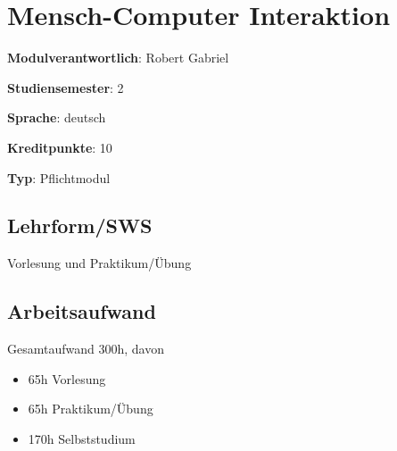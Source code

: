 \hypertarget{mensch-computer-interaktionpathlabelmi-2017modulbeschreibungen-bachelorba_mensch-computer_interaktion}{%
\chapter{Mensch-Computer
Interaktion\label{/mi-2017/modulbeschreibungen-bachelor/BA_Mensch-Computer_Interaktion}}\label{mensch-computer-interaktionpathlabelmi-2017modulbeschreibungen-bachelorba_mensch-computer_interaktion}}

\begin{modulHead}
\textbf{Modulverantwortlich}: Robert
Gabriel
\end{modulHead}
\begin{modulHead}
\textbf{Studiensemester}:
2
\end{modulHead}
\begin{modulHead}
\textbf{Sprache}:
deutsch
\end{modulHead}
\begin{modulHead}
\textbf{Kreditpunkte}:
10
\end{modulHead}
\begin{modulHead}
\textbf{Typ}:
Pflichtmodul
\end{modulHead}


\hypertarget{lehrformswspathlabelmi-2017modulbeschreibungen-bachelorba_mensch-computer_interaktion}{%
\section*{Lehrform/SWS\label{/mi-2017/modulbeschreibungen-bachelor/BA_Mensch-Computer_Interaktion}}\label{lehrformswspathlabelmi-2017modulbeschreibungen-bachelorba_mensch-computer_interaktion}}

Vorlesung und Praktikum/Übung

\hypertarget{arbeitsaufwandpathlabelmi-2017modulbeschreibungen-bachelorba_mensch-computer_interaktion}{%
\section*{Arbeitsaufwand\label{/mi-2017/modulbeschreibungen-bachelor/BA_Mensch-Computer_Interaktion}}\label{arbeitsaufwandpathlabelmi-2017modulbeschreibungen-bachelorba_mensch-computer_interaktion}}

Gesamtaufwand 300h, davon

\begin{itemize}
\tightlist
\item
  65h Vorlesung
\item
  65h Praktikum/Übung
\item
  170h Selbststudium
\end{itemize}


